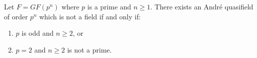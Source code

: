 Let $F = GF(p^n)$ where $p$ is a prime and $n \geq 1$. There exists an André quasifield of order $p^n$ which is not a field if and only if:

\begin{enumerate}
\item[(a)] $p$ is odd and $n \geq 2$, or
\item[(b)] $p = 2$ and $n \geq 2$ is not a prime.
\end{enumerate}
